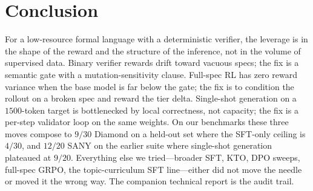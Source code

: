 \documentclass[11pt]{article}
\begin{document}
\section{Conclusion}
\label{sec:conclusion}

For a low-resource formal language with a deterministic verifier,
the leverage is in the shape of the reward and the structure of
the inference, not in the volume of supervised data. Binary
verifier rewards drift toward vacuous specs; the fix is a semantic
gate with a mutation-sensitivity clause. Full-spec RL has zero
reward variance when the base model is far below the gate; the fix
is to condition the rollout on a broken spec and reward the tier
delta. Single-shot generation on a $1500$-token target is
bottlenecked by local correctness, not capacity; the fix is a
per-step validator loop on the same weights. On our benchmarks
these three moves compose to $9/30$ Diamond on a held-out set where
the SFT-only ceiling is $4/30$, and $12/20$ SANY on the earlier
suite where single-shot generation plateaued at $9/20$. Everything
else we tried---broader SFT, KTO, DPO sweeps, full-spec GRPO, the
topic-curriculum SFT line---either did not move the needle or
moved it the wrong way. The companion technical report is the
audit trail.
\end{document}
